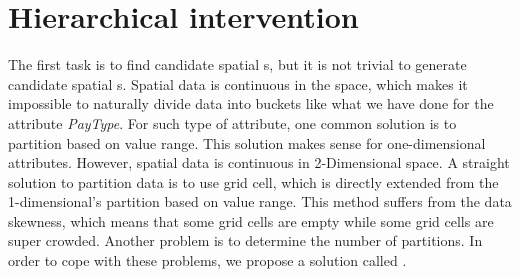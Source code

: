 







\section{Hierarchical intervention}
\label{sec:hei_intervention}

The first task is to find candidate spatial {\explanation}s, but
it is not trivial to generate candidate spatial {\explanation}s. 
Spatial data is continuous in the space, which makes it impossible to naturally divide data into buckets like what we have done for the attribute \emph{PayType}. 
For such type of attribute, one common solution is to partition based on value range. 
This solution makes sense for one-dimensional attributes. 
However, spatial data is continuous in 2-Dimensional space. 
A straight solution to partition data is to use grid cell, which is directly extended from the 1-dimensional's partition based on value range. 
This method suffers from the data skewness, which means that some grid cells are empty while some grid cells are super crowded. 
Another problem is to determine the number of partitions. 
In order to cope with these problems, we propose a solution called {\solution}. 


